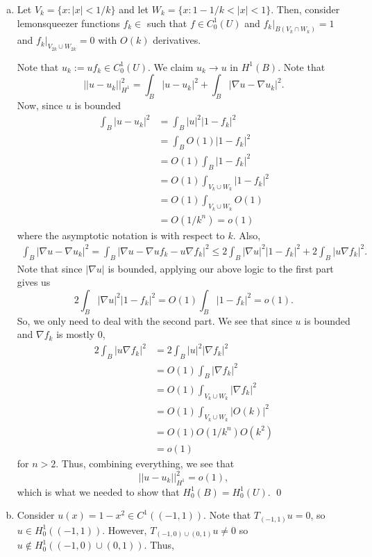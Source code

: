 \documentclass{article}
\newcommand{\D}{\nabla}
\begin{document}
\newpage
{} 
\tri
\hop 
\solution
\begin{enumerate}[(a)]
    \item Let $V_k = \{x : |x| < 1/k\}$ and let $W_k =\{x: 1- 1/k < |x| < 1\}$. Then, consider lemonsqueezer functions $f_k \in $ such that $f \in C_0^1(U)$ and $f_k|_{B(V_k \cap W_k)} = 1$ and $f_k|_{V_{2k} \cup W_{2k}} = 0$ with $O(k)$ derivatives. 
    

    Note that $u_k := uf_k \in C_0^1(U)$. We claim $u_k \to u$ in $H^1(B)$. Note that 
    \[||u-u_k||_{H^1}^2 = \int_B|u - u_k|^2+ \int_B|\D u -\D u_k|^2.\] 
    Now, since $u$ is bounded
    \begin{align*}
        \int_B |u - u_k|^2 &= \int_B|u|^2|1-f_k|^2 \\
        &= \int_BO(1)|1-f_k|^2 \\
        &=O(1) \int_B|1-f_k|^2 \\
        &=O(1) \int_{V_k \cup W_k}|1-f_k|^2 \\
        &=O(1) \int_{V_k \cup W_k}O(1) \\
        &=O(1/k^n)=o(1)
    \end{align*}
    where the asymptotic notation is with respect to $k$.
    Also, 
    \begin{align*}
        \int_B|\D u -\D u_k|^2 = \int_B|\D u -\D u f_k - u \D f_k |^2 \le 2\int_B|\D u|^2 |1-f_k|^2 + 2\int_B|u \D f_k|^2.
    \end{align*}
    Note that since $|\D u|$ is bounded, applying our above logic to the first part gives us 
    \[2\int_B|\D u|^2 |1-f_k|^2 = O(1) \int_B|1-f_k|^2 = o(1).\]
    So, we only need to deal with the second part. We see that since $u$ is bounded and $\D f_k$ is mostly 0,
    \begin{align*}
        2\int_B|u \D f_k|^2 &=  2\int_B|u|^2|\D f_k|^2\\
        &= O(1)\int_B |\D f_k|^2 \\
        &= O(1)\int_{V_k \cup W_k}|\D f_k|^2 \\
        &= O(1)\int_{V_k \cup W_k}|O(k)|^2 \\
        &= O(1) O(1/k^n) O(k^2) \\
        &= o(1)
    \end{align*}
    for $n > 2$. Thus, combining everything, we see that 
    \[||u-u_k||_{H^1}^2 = o(1),\]
    which is what we needed to show that $H_0^1(B) = H_0^1(U)$. \qed
    \item Consider $u(x) = 1- x^2 \in C^1((-1,1))$. Note that $T_{(-1,1)} u = 0$, so $u \in H_0^1((-1,1))$. However, $T_{(-1,0) \cup (0,1)}u \ne0 $ so $u \not \in H_0^1((-1,0) \cup (0,1))$. Thus, 

\end{enumerate}
\end{document}
